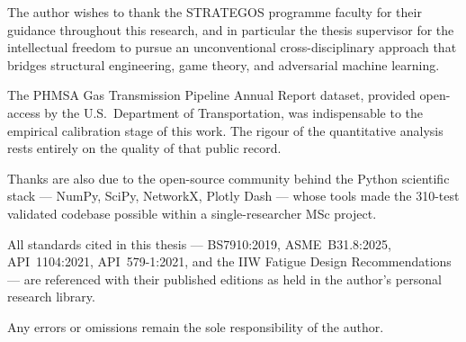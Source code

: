 The author wishes to thank the STRATEGOS programme faculty for their
guidance throughout this research, and in particular the thesis supervisor
for the intellectual freedom to pursue an unconventional cross-disciplinary
approach that bridges structural engineering, game theory, and adversarial
machine learning.

The \ac{PHMSA} Gas Transmission Pipeline Annual Report dataset, provided
open-access by the U.S.\ Department of Transportation, was indispensable
to the empirical calibration stage of this work.  The rigour of the
quantitative analysis rests entirely on the quality of that public record.

Thanks are also due to the open-source community behind the Python
scientific stack --- NumPy, SciPy, NetworkX, Plotly Dash --- whose
tools made the 310-test validated codebase possible within a
single-researcher MSc project.

All standards cited in this thesis — \ac{BS7910}:2019, \acs{ASME}~B31.8:2025,
\acs{API}~1104:2021, \acs{API}~579-1:2021, and the \acs{IIW} Fatigue Design
Recommendations — are referenced with their published editions as held
in the author's personal research library.

Any errors or omissions remain the sole responsibility of the author.
